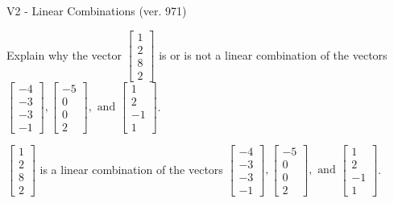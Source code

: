 \begin{exercise}
  \begin{exerciseTitle}V2 - Linear Combinations (ver. 971)\end{exerciseTitle}
  \begin{exerciseStatement}
    Explain why the vector \(\left[\begin{array}{c}
1 \\
2 \\
8 \\
2
\end{array}\right]\)  is or is not a linear 
	combination of the vectors \(\left[\begin{array}{c}
-4 \\
-3 \\
-3 \\
-1
\end{array}\right] , \left[\begin{array}{c}
-5 \\
0 \\
0 \\
2
\end{array}\right] , \text{ and } \left[\begin{array}{c}
1 \\
2 \\
-1 \\
1
\end{array}\right]\).
	


  \end{exerciseStatement}
  \begin{exerciseAnswer}
   \(\left[\begin{array}{c}
1 \\
2 \\
8 \\
2
\end{array}\right]\) 
  	 is  
	a linear combination of the vectors \(\left[\begin{array}{c}
-4 \\
-3 \\
-3 \\
-1
\end{array}\right] , \left[\begin{array}{c}
-5 \\
0 \\
0 \\
2
\end{array}\right] , \text{ and } \left[\begin{array}{c}
1 \\
2 \\
-1 \\
1
\end{array}\right]\).

	
  


  \end{exerciseAnswer}
\end{exercise}